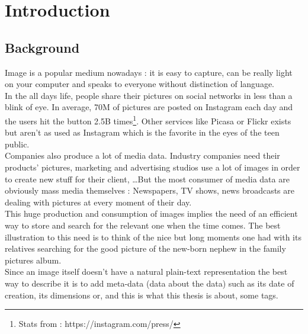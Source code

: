 \chapter{Introduction} %

\label{Chapter1} %



\section{Background}

Image is a popular medium nowadays : it is easy to capture, can be really light on your computer and speaks to everyone without distinction of language.\\

In the all days life, people share their pictures on social networks in less than a blink of eye. In average, 70M of pictures are posted on Instagram each day and the users hit the  button 2.5B times\footnote{Stats from : https://instagram.com/press/}. Other services like Picasa or Flickr exists but aren't as used as Instagram which is the favorite in the eyes of the teen public.\\
Companies also produce a lot of media data. Industry companies need their products' pictures, marketing and advertising studios use a lot of images in order to create new stuff for their client, \dots But the most consumer of media data are obviously mass media themselves : Newspapers, TV shows, news broadcasts are dealing with pictures at every moment of their day.\\

This huge production and consumption of images implies the need of an efficient way to store and search for the relevant one when the time comes. The best illustration to this need is to think of the nice but long moments one had with its relatives searching for the good picture of the new-born nephew in the family pictures album.\\
Since an image itself doesn't have a natural plain-text representation the best way to describe it is to add meta-data (data about the data) such as its date of creation, its dimensions or, and this is what this thesis is about, some tags.\\

